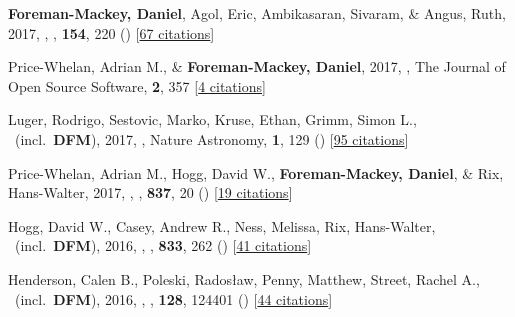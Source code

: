 \item[{\color{numcolor}\scriptsize28}] \textbf{Foreman-Mackey, Daniel}, Agol, Eric, Ambikasaran, Sivaram, \& Angus, Ruth, 2017, , \aj, \textbf{154}, 220 () [\href{http://adsabs.harvard.edu/abs/2017AJ....154..220F}{67 citations}]

\item[{\color{numcolor}\scriptsize27}] Price-Whelan, Adrian M., \& \textbf{Foreman-Mackey, Daniel}, 2017, , The Journal of Open Source Software, \textbf{2}, 357 [\href{http://adsabs.harvard.edu/abs/2017JOSS....2..357P}{4 citations}]

\item[{\color{numcolor}\scriptsize26}] Luger, Rodrigo, Sestovic, Marko, Kruse, Ethan, Grimm, Simon L., \etal\ (incl.\ \textbf{DFM}), 2017, , Nature Astronomy, \textbf{1}, 129 () [\href{http://adsabs.harvard.edu/abs/2017NatAs...1E.129L}{95 citations}]

\item[{\color{numcolor}\scriptsize25}] Price-Whelan, Adrian M., Hogg, David W., \textbf{Foreman-Mackey, Daniel}, \& Rix, Hans-Walter, 2017, , \apj, \textbf{837}, 20 () [\href{http://adsabs.harvard.edu/abs/2017ApJ...837...20P}{19 citations}]

\item[{\color{numcolor}\scriptsize24}] Hogg, David W., Casey, Andrew R., Ness, Melissa, Rix, Hans-Walter, \etal\ (incl.\ \textbf{DFM}), 2016, , \apj, \textbf{833}, 262 () [\href{http://adsabs.harvard.edu/abs/2016ApJ...833..262H}{41 citations}]

\item[{\color{numcolor}\scriptsize23}] Henderson, Calen B., Poleski, Rados{\l}aw, Penny, Matthew, Street, Rachel A., \etal\ (incl.\ \textbf{DFM}), 2016, , \pasp, \textbf{128}, 124401 () [\href{http://adsabs.harvard.edu/abs/2016PASP..128l4401H}{44 citations}]

